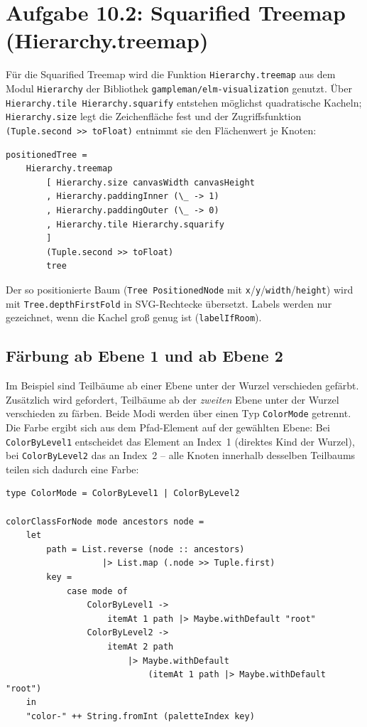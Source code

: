 \documentclass[11pt,a4paper]{article}
\begin{document}
\section*{Aufgabe 10.2: Squarified Treemap (Hierarchy.treemap)}

Für die Squarified Treemap wird die Funktion \texttt{Hierarchy.treemap} aus dem
Modul \texttt{Hierarchy} der Bibliothek \texttt{gampleman/elm-visualization}
genutzt. Über \texttt{Hierarchy.tile Hierarchy.squarify} entstehen möglichst
quadratische Kacheln; \texttt{Hierarchy.size} legt die Zeichenfläche fest und
der Zugriffsfunktion \texttt{(Tuple.second >> toFloat)} entnimmt sie den
Flächenwert je Knoten:

\begin{verbatim}
positionedTree =
    Hierarchy.treemap
        [ Hierarchy.size canvasWidth canvasHeight
        , Hierarchy.paddingInner (\_ -> 1)
        , Hierarchy.paddingOuter (\_ -> 0)
        , Hierarchy.tile Hierarchy.squarify
        ]
        (Tuple.second >> toFloat)
        tree
\end{verbatim}

Der so positionierte Baum (\texttt{Tree PositionedNode} mit
\texttt{x}/\texttt{y}/\texttt{width}/\texttt{height}) wird mit
\texttt{Tree.depthFirstFold} in SVG-Rechtecke übersetzt. Labels werden nur
gezeichnet, wenn die Kachel groß genug ist (\texttt{labelIfRoom}).

\subsection*{Färbung ab Ebene 1 und ab Ebene 2}

Im Beispiel sind Teilbäume ab einer Ebene unter der Wurzel verschieden
gefärbt. Zusätzlich wird gefordert, Teilbäume ab der \emph{zweiten} Ebene unter
der Wurzel verschieden zu färben. Beide Modi werden über einen Typ
\texttt{ColorMode} getrennt. Die Farbe ergibt sich aus dem Pfad-Element auf der
gewählten Ebene: Bei \texttt{ColorByLevel1} entscheidet das Element an Index~1
(direktes Kind der Wurzel), bei \texttt{ColorByLevel2} das an Index~2 -- alle
Knoten innerhalb desselben Teilbaums teilen sich dadurch eine Farbe:

\begin{verbatim}
type ColorMode = ColorByLevel1 | ColorByLevel2

colorClassForNode mode ancestors node =
    let
        path = List.reverse (node :: ancestors)
                   |> List.map (.node >> Tuple.first)
        key =
            case mode of
                ColorByLevel1 ->
                    itemAt 1 path |> Maybe.withDefault "root"
                ColorByLevel2 ->
                    itemAt 2 path
                        |> Maybe.withDefault
                            (itemAt 1 path |> Maybe.withDefault "root")
    in
    "color-" ++ String.fromInt (paletteIndex key)
\end{verbatim}
\end{document}
